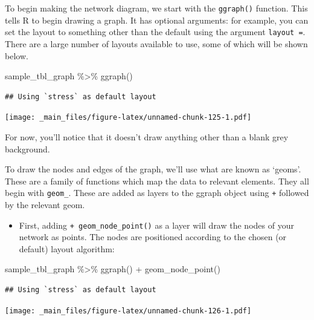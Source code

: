 \documentclass[
]{book}
\newenvironment{Shaded}{\begin{snugshade}}{\end{snugshade}}
\newcommand{\FunctionTok}[1]{\textcolor[rgb]{0.00,0.00,0.00}{#1}}
\newcommand{\NormalTok}[1]{#1}
\newcommand{\SpecialCharTok}[1]{\textcolor[rgb]{0.00,0.00,0.00}{#1}}
\providecommand{\tightlist}{%
  \setlength{\itemsep}{0pt}\setlength{\parskip}{0pt}}
\begin{document}
To begin making the network diagram, we start with the \texttt{ggraph()} function. This tells R to begin drawing a graph. It has optional arguments: for example, you can set the layout to something other than the default using the argument \texttt{layout\ =}. There are a large number of layouts available to use, some of which will be shown below.

\begin{Shaded}
\begin{Highlighting}[]
\NormalTok{sample\_tbl\_graph }\SpecialCharTok{\%\textgreater{}\%} 
  \FunctionTok{ggraph}\NormalTok{()}
\end{Highlighting}
\end{Shaded}

\begin{verbatim}
## Using `stress` as default layout
\end{verbatim}

\texttt{[image: \_main\_files/figure-latex/unnamed-chunk-125-1.pdf]}

For now, you'll notice that it doesn't draw anything other than a blank grey background.

To draw the nodes and edges of the graph, we'll use what are known as `geoms'. These are a family of functions which map the data to relevant elements. They all begin with \texttt{geom\_}. These are added as layers to the ggraph object using \texttt{+} followed by the relevant geom.

\begin{itemize}
\tightlist
\item
  First, adding \texttt{+\ geom\_node\_point()} as a layer will draw the nodes of your network as points. The nodes are positioned according to the chosen (or default) layout algorithm:
\end{itemize}

\begin{Shaded}
\begin{Highlighting}[]
\NormalTok{sample\_tbl\_graph }\SpecialCharTok{\%\textgreater{}\%} 
  \FunctionTok{ggraph}\NormalTok{() }\SpecialCharTok{+} 
  \FunctionTok{geom\_node\_point}\NormalTok{()}
\end{Highlighting}
\end{Shaded}

\begin{verbatim}
## Using `stress` as default layout
\end{verbatim}

\texttt{[image: \_main\_files/figure-latex/unnamed-chunk-126-1.pdf]}
\end{document}
